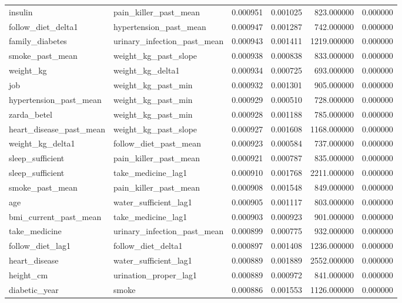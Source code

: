 \begin{longtable}{llrrrr}
insulin & pain\_killer\_past\_mean & 0.000951 & 0.001025 & 823.000000 & 0.000000 \\
follow\_diet\_delta1 & hypertension\_past\_mean & 0.000947 & 0.001287 & 742.000000 & 0.000000 \\
family\_diabetes & urinary\_infection\_past\_mean & 0.000943 & 0.001411 & 1219.000000 & 0.000000 \\
smoke\_past\_mean & weight\_kg\_past\_slope & 0.000938 & 0.000838 & 833.000000 & 0.000000 \\
weight\_kg & weight\_kg\_delta1 & 0.000934 & 0.000725 & 693.000000 & 0.000000 \\
job & weight\_kg\_past\_min & 0.000932 & 0.001301 & 905.000000 & 0.000000 \\
hypertension\_past\_mean & weight\_kg\_past\_min & 0.000929 & 0.000510 & 728.000000 & 0.000000 \\
zarda\_betel & weight\_kg\_past\_min & 0.000928 & 0.001188 & 785.000000 & 0.000000 \\
heart\_disease\_past\_mean & weight\_kg\_past\_slope & 0.000927 & 0.001608 & 1168.000000 & 0.000000 \\
weight\_kg\_delta1 & follow\_diet\_past\_mean & 0.000923 & 0.000584 & 737.000000 & 0.000000 \\
sleep\_sufficient & pain\_killer\_past\_mean & 0.000921 & 0.000787 & 835.000000 & 0.000000 \\
sleep\_sufficient & take\_medicine\_lag1 & 0.000910 & 0.001768 & 2211.000000 & 0.000000 \\
smoke\_past\_mean & pain\_killer\_past\_mean & 0.000908 & 0.001548 & 849.000000 & 0.000000 \\
age & water\_sufficient\_lag1 & 0.000905 & 0.001117 & 803.000000 & 0.000000 \\
bmi\_current\_past\_mean & take\_medicine\_lag1 & 0.000903 & 0.000923 & 901.000000 & 0.000000 \\
take\_medicine & urinary\_infection\_past\_mean & 0.000899 & 0.000775 & 932.000000 & 0.000000 \\
follow\_diet\_lag1 & follow\_diet\_delta1 & 0.000897 & 0.001408 & 1236.000000 & 0.000000 \\
heart\_disease & water\_sufficient\_lag1 & 0.000889 & 0.001889 & 2552.000000 & 0.000000 \\
height\_cm & urination\_proper\_lag1 & 0.000889 & 0.000972 & 841.000000 & 0.000000 \\
diabetic\_year & smoke & 0.000886 & 0.001553 & 1126.000000 & 0.000000 \\

\end{longtable}
